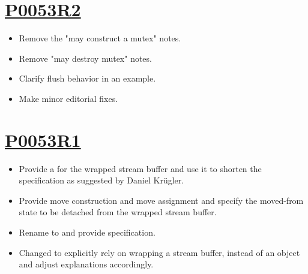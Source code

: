 \documentclass[ebook,11pt,article]{memoir}
\begin{document}
\section{\href{https://wg21.link/P0053R2}{P0053R2}}
\begin{itemize}
\item Remove the "may construct a mutex" notes.
\item Remove "may destroy mutex" notes.
\item Clarify  flush behavior in an example.
\item Make minor editorial fixes.
\end{itemize}

\section{\href{https://wg21.link/P0053R1}{P0053R1}}
\begin{itemize}
\item Provide a  for the wrapped stream buffer and use it to shorten the specification as suggested by Daniel Kr\"ugler.
\item Provide move construction and move assignment and specify the moved-from state to be detached from the wrapped stream buffer.
\item Rename  to  and provide  specification.
\item Changed to explicitly rely on wrapping a stream buffer, instead of an  object and adjust explanations accordingly.
\end{itemize}
\end{document}
